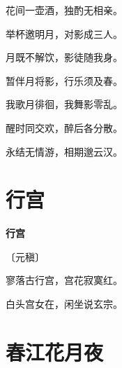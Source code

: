 \documentclass[12pt,UTF-8,openany,fontset=none]{ctexbook}
\begin{document}
\begin{center}
    \begin{Large}

        花间一壶酒，独酌无相亲。

        举杯邀明月，对影成三人。

        月既不解饮，影徒随我身。

        暂伴月将影，行乐须及春。

        我歌月徘徊，我舞影零乱。

        醒时同交欢，醉后各分散。

        永结无情游，相期邈云汉。

    \end{Large}

\end{center}

\vspace{8pt}
\clearpage

\section{行宫}


\begin{center}
    {\bfseries 行宫}

    \vspace{18pt}

    \begin{large}\xuwen
        〔元稹〕
    \end{large}

\end{center}

    \vspace{18pt}

\begin{center}
    \begin{Large}

        寥落古行宫，宫花寂寞红。

        白头宫女在，闲坐说玄宗。

    \end{Large}

\end{center}

\vspace{8pt}
\clearpage

\section{春江花月夜}
\end{document}
